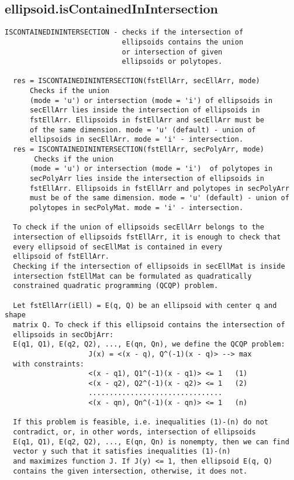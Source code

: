\subsection{\texorpdfstring{ellipsoid.isContainedInIntersection}{isContainedInIntersection}}\label{method:ellipsoid.isContainedInIntersection}
\begin{verbatim}
ISCONTAINEDININTERSECTION - checks if the intersection of
                            ellipsoids contains the union
                            or intersection of given
                            ellipsoids or polytopes.

  res = ISCONTAINEDININTERSECTION(fstEllArr, secEllArr, mode)
      Checks if the union
      (mode = 'u') or intersection (mode = 'i') of ellipsoids in
      secEllArr lies inside the intersection of ellipsoids in
      fstEllArr. Ellipsoids in fstEllArr and secEllArr must be
      of the same dimension. mode = 'u' (default) - union of
      ellipsoids in secEllArr. mode = 'i' - intersection.
  res = ISCONTAINEDININTERSECTION(fstEllArr, secPolyArr, mode)
       Checks if the union
      (mode = 'u') or intersection (mode = 'i')  of polytopes in
      secPolyArr lies inside the intersection of ellipsoids in
      fstEllArr. Ellipsoids in fstEllArr and polytopes in secPolyArr
      must be of the same dimension. mode = 'u' (default) - union of
      polytopes in secPolyMat. mode = 'i' - intersection.

  To check if the union of ellipsoids secEllArr belongs to the
  intersection of ellipsoids fstEllArr, it is enough to check that
  every ellipsoid of secEllMat is contained in every
  ellipsoid of fstEllArr.
  Checking if the intersection of ellipsoids in secEllMat is inside
  intersection fstEllMat can be formulated as quadratically
  constrained quadratic programming (QCQP) problem.

  Let fstEllArr(iEll) = E(q, Q) be an ellipsoid with center q and shape
  matrix Q. To check if this ellipsoid contains the intersection of
  ellipsoids in secObjArr:
  E(q1, Q1), E(q2, Q2), ..., E(qn, Qn), we define the QCQP problem:
                    J(x) = <(x - q), Q^(-1)(x - q)> --> max
  with constraints:
                    <(x - q1), Q1^(-1)(x - q1)> <= 1   (1)
                    <(x - q2), Q2^(-1)(x - q2)> <= 1   (2)
                    ................................
                    <(x - qn), Qn^(-1)(x - qn)> <= 1   (n)

  If this problem is feasible, i.e. inequalities (1)-(n) do not
  contradict, or, in other words, intersection of ellipsoids
  E(q1, Q1), E(q2, Q2), ..., E(qn, Qn) is nonempty, then we can find
  vector y such that it satisfies inequalities (1)-(n)
  and maximizes function J. If J(y) <= 1, then ellipsoid E(q, Q)
  contains the given intersection, otherwise, it does not.


\end{verbatim}
